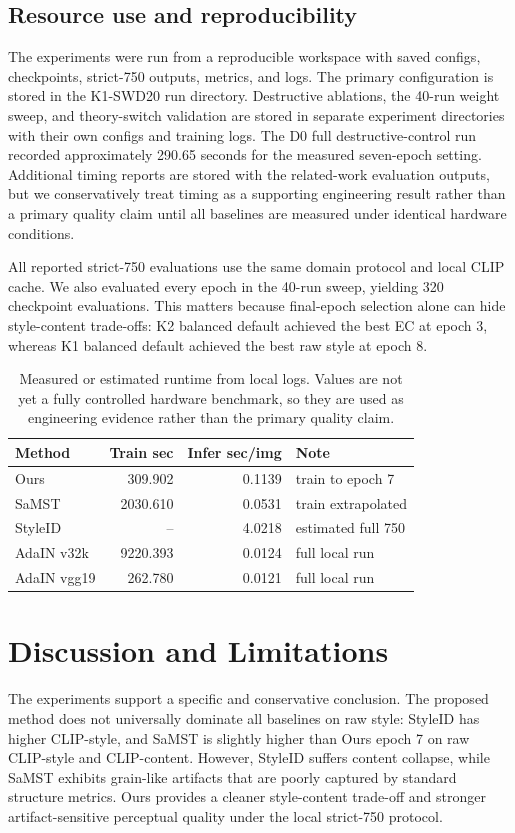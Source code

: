 ﻿\documentclass{article}
\begin{document}
\subsection{Resource use and reproducibility}
The experiments were run from a reproducible workspace with saved configs, checkpoints, strict-750 outputs, metrics, and logs. The primary configuration is stored in the K1-SWD20 run directory. Destructive ablations, the 40-run weight sweep, and theory-switch validation are stored in separate experiment directories with their own configs and training logs. The D0 full destructive-control run recorded approximately 290.65 seconds for the measured seven-epoch setting. Additional timing reports are stored with the related-work evaluation outputs, but we conservatively treat timing as a supporting engineering result rather than a primary quality claim until all baselines are measured under identical hardware conditions.

All reported strict-750 evaluations use the same domain protocol and local CLIP cache. We also evaluated every epoch in the 40-run sweep, yielding 320 checkpoint evaluations. This matters because final-epoch selection alone can hide style-content trade-offs: K2 balanced default achieved the best EC at epoch 3, whereas K1 balanced default achieved the best raw style at epoch 8.

\begin{table}[t]
\centering
\caption{Measured or estimated runtime from local logs. Values are not yet a fully controlled hardware benchmark, so they are used as engineering evidence rather than the primary quality claim.}
\label{tab:runtime}
\begin{tabular}{lrrl}
\toprule
Method & Train sec & Infer sec/img & Note \\
\midrule
Ours & 309.902 & 0.1139 & train to epoch 7 \\
SaMST & 2030.610 & 0.0531 & train extrapolated \\
StyleID & -- & 4.0218 & estimated full 750 \\
AdaIN v32k & 9220.393 & 0.0124 & full local run \\
AdaIN vgg19 & 262.780 & 0.0121 & full local run \\
\bottomrule
\end{tabular}
\end{table}

\section{Discussion and Limitations}
The experiments support a specific and conservative conclusion. The proposed method does not universally dominate all baselines on raw style: StyleID has higher CLIP-style, and SaMST is slightly higher than Ours epoch 7 on raw CLIP-style and CLIP-content. However, StyleID suffers content collapse, while SaMST exhibits grain-like artifacts that are poorly captured by standard structure metrics. Ours provides a cleaner style-content trade-off and stronger artifact-sensitive perceptual quality under the local strict-750 protocol.
\end{document}

